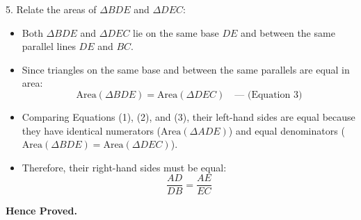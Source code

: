 \begin{enumerate}
5. Relate the areas of $\Delta BDE$ and $\Delta DEC$:
   \begin{itemize}
       \item Both $\Delta BDE$ and $\Delta DEC$ lie on the same base $DE$ and between the same parallel lines $DE$ and $BC$.
       \item Since triangles on the same base and between the same parallels are equal in area:
       \[
       \text{Area}(\Delta BDE) = \text{Area}(\Delta DEC) \quad \text{--- (Equation 3)}
       \]
   \end{itemize}


   \begin{itemize}
       \item Comparing Equations (1), (2), and (3), their left-hand sides are equal because they have identical numerators ($\text{Area}(\Delta ADE)$) and equal denominators ($\text{Area}(\Delta BDE) = \text{Area}(\Delta DEC)$).
       \item Therefore, their right-hand sides must be equal:
       \[
       \frac{AD}{DB} = \frac{AE}{EC}
       \]
   \end{itemize}

\noindent
\textbf{Hence Proved.}




\end{enumerate}

